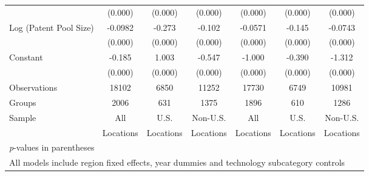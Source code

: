 \begin{table}[htbp]
\begin{tabular}{l*{6}{c}}
                &  (0.000)&  (0.000)&  (0.000)&  (0.000)&  (0.000)&  (0.000)\\
Log (Patent Pool Size)&  -0.0982&   -0.273&   -0.102&  -0.0571&   -0.145&  -0.0743\\
                &  (0.000)&  (0.000)&  (0.000)&  (0.000)&  (0.000)&  (0.000)\\
Constant        &   -0.185&    1.003&   -0.547&   -1.000&   -0.390&   -1.312\\
                &  (0.000)&  (0.000)&  (0.000)&  (0.000)&  (0.000)&  (0.000)\\
\hline
Observations    &    18102&     6850&    11252&    17730&     6749&    10981\\
Groups          &     2006&      631&     1375&     1896&      610&     1286\\
Sample&All &U.S. &Non-U.S.&All &U.S. &Non-U.S. \\
          &Locations &Locations&Locations&Locations &Locations&Locations \\\hline\hline
\multicolumn{7}{l}{\footnotesize \textit{p}-values in parentheses}\\
\multicolumn{7}{l}{\footnotesize All models include region fixed effects, year dummies and technology subcategory controls}\\
\end{tabular}
\end{table}
